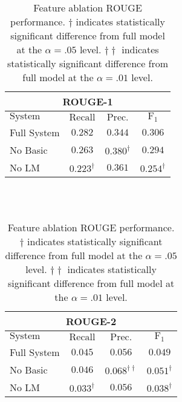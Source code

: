 \begin{table}[h]
\centering
\begin{tabular}{l c c c}
\multicolumn{4}{c}{ROUGE-1}\\
\hline
\hline
$\mathrm{System}$ & $\mathrm{Recall}$ & $\mathrm{Prec.}$ & $\mathrm{F}_1$\\
[0.5ex]
\hline
Full System & $0.282$ & $0.344$ & $0.306$ \\
No Basic    & $0.263$ & $0.380^\dagger$ & $0.294$ \\
No LM       & $0.223^\dagger$ & $0.361$ & $0.254^\dagger$ \\
\hline %
\end{tabular}
~\\[1ex]
~\\
\begin{tabular}{l c c c}
\multicolumn{4}{c}{ROUGE-2}\\
\hline
\hline
$\mathrm{System}$ & $\mathrm{Recall}$ & $\mathrm{Prec.}$ & $\mathrm{F}_1$\\[0.5ex]
\hline
Full System & $0.045$ & $0.056$ & $0.049$ \\
No Basic    & $0.046$ & $0.068^{\dagger\dagger}$ & $0.051^\dagger$ \\
No LM       & $0.033^\dagger$ & $0.056$ & $0.038^\dagger$ \\
\hline %
\end{tabular}
\caption{Feature ablation ROUGE performance. 
    $\dagger$ indicates statistically significant difference from 
full model at the $\alpha=.05$ level.
    $\dagger\dagger$ indicates statistically significant difference from 
full model at the $\alpha=.01$ level.
    } %
\label{tab:farouge}
\end{table}




